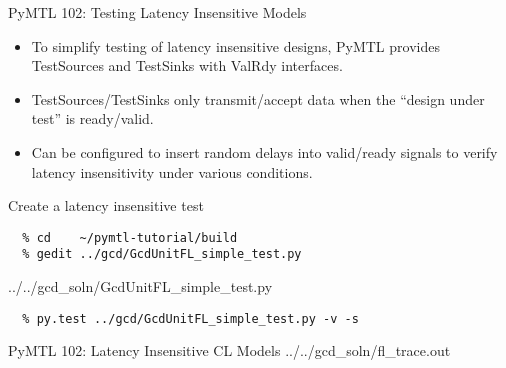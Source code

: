 \begin{frame}{PyMTL 102: Testing Latency Insensitive Models}

\begin{itemize}
  \item To simplify testing of latency insensitive designs, PyMTL provides
        TestSources and TestSinks with ValRdy interfaces.
  \smallskip
  \item TestSources/TestSinks only transmit/accept data when the ``design
        under test'' is ready/valid.
  \smallskip
  \item Can be configured to insert random delays into valid/ready signals
        to verify latency insensitivity under various conditions.
\end{itemize}

\end{frame}

\begin{task}\begin{frame}[fragile]{Create a latency insensitive test}
\vspace{-0.25in}
\begin{verbatim}
  % cd    ~/pymtl-tutorial/build
  % gedit ../gcd/GcdUnitFL_simple_test.py
\end{verbatim}

%
{../../gcd_soln/GcdUnitFL_simple_test.py}

\begin{verbatim}
  % py.test ../gcd/GcdUnitFL_simple_test.py -v -s
\end{verbatim}
\end{frame}
\end{task}

\begin{frame}{PyMTL 102: Latency Insensitive CL Models}
\vspace{-0.25in}
%
{../../gcd_soln/fl_trace.out}

\end{frame}

